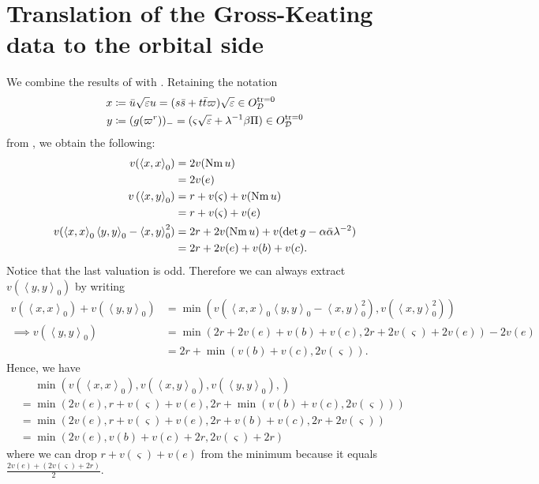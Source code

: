 \section{Translation of the Gross-Keating data to the orbital side}
We combine the results of  with .
Retaining the notation
\begin{align*}
  x &\coloneqq \bar u \sqrt{\varepsilon} u = (s \bar s + t \bar t \varpi) \sqrt{\varepsilon} \in O_\mathcal D^{\operatorname{tr} = 0} \\
  y &\coloneqq (g(\varpi^r))_- = (\varsigma\sqrt{\varepsilon} + \lambda^{-1} \beta \Pi) \in O_\mathcal D^{\operatorname{tr} = 0}
\end{align*}
from , we obtain the following:
\begin{align*}
  v(\left\langle x,x \right\rangle _0)
    &= 2 v(\operatorname{Nm} u) \\
    &= 2v(e) \\
  v\left( \left\langle x,y \right\rangle _0 \right)
    &= r + v(\varsigma) + v(\operatorname{Nm} u) \\
    &= r + v(\varsigma) + v(e) \\
  v(
    \left\langle x,x \right\rangle _0 \left\langle y,y \right\rangle _0
    - \left\langle x,y \right\rangle^2_0
  )
    &= 2r + 2 v(\operatorname{Nm} u) + v(\det g - \alpha \bar \alpha \lambda^{-2}) \\
    &= 2r + 2v(e) + v(b) + v(c).
\end{align*}
Notice that the last valuation is odd.
Therefore we can always extract $v(\left\langle y,y \right\rangle _0)$ by writing
\begin{align*}
  v\left(\left\langle x,x \right\rangle _0\right) + v\left(\left\langle y,y \right\rangle _0\right)
  &= \min \left( v\left( \left\langle x,x \right\rangle _0 \left\langle y,y \right\rangle _0 - \left\langle x,y \right\rangle^2_0 \right),
    v(\left\langle x,y \right\rangle^2_0) \right) \\
  \implies  v\left(\left\langle y,y \right\rangle _0\right)
  &= \min(2r + 2v(e) + v(b) + v(c), 2r + 2v(\varsigma) + 2v(e)) - 2v(e) \\
  &= 2r + \min(v(b) + v(c), 2v(\varsigma)).
\end{align*}
Hence, we have
\begin{align*}
  &\phantom= \min\left(
    v(\left\langle x,x \right\rangle _0),
    v(\left\langle x,y \right\rangle _0),
    v(\left\langle y,y \right\rangle _0),
  \right) \\
  &= \min\left( 2v(e), r+v(\varsigma)+v(e), 2r+\min(v(b)+v(c), 2v(\varsigma)) \right) \\
  &= \min\left( 2v(e), r+v(\varsigma)+v(e), 2r+v(b)+v(c), 2r+2v(\varsigma) \right) \\
  &= \min\left( 2v(e), v(b)+v(c)+2r, 2v(\varsigma)+2r \right)
\end{align*}
where we can drop $r+v(\varsigma)+v(e)$ from the minimum because it equals
$\frac{2v(e) + (2v(\varsigma)+2r)}{2}$.

